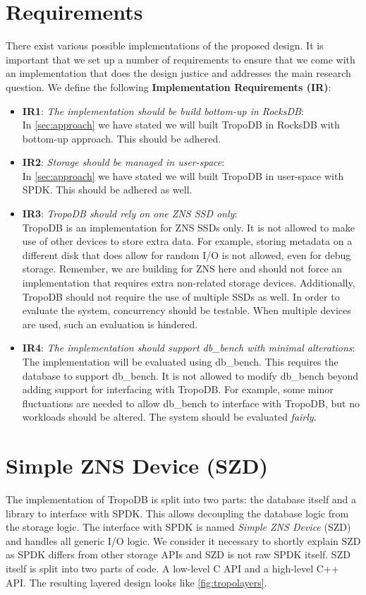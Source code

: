 \section{Requirements}
There exist various possible implementations of the proposed design. It is important that we set up a number of requirements to ensure that we come with an implementation that does the design justice and addresses the main research question. We define the following \textbf{Implementation Requirements (IR)}:
\begin{itemize}
    \item \textbf{IR1}: \textit{The implementation should be build bottom-up in RocksDB}:\\
    In \autoref{sec:approach} we have stated we will built TropoDB in RocksDB with bottom-up approach. This should be adhered.
    \item \textbf{IR2}: \textit{Storage should be managed in user-space}:\\
    In \autoref{sec:approach} we have stated we will built TropoDB in user-space with SPDK. This should be adhered as well.
    \item \textbf{IR3}: \textit{TropoDB should rely on one ZNS SSD only}:\\
    TropoDB is an implementation for ZNS SSDs only. It is not allowed to make use of other devices to store extra data. For example, storing metadata on a different disk that does allow for random I/O is not allowed, even for debug storage. Remember, we are building for ZNS here and should not force an implementation that requires extra non-related storage devices. Additionally, TropoDB should not require the use of multiple SSDs as well. In order to evaluate the system, concurrency should be testable. When multiple devices are used, such an evaluation is hindered.
    \item \textbf{IR4}: \textit{The implementation should support db\_bench with minimal alterations}:\\
    The implementation will be evaluated using db\_bench. This requires the database to support db\_bench. It is not allowed to modify db\_bench beyond adding support for interfacing with TropoDB. For example, some minor fluctuations are needed to allow db\_bench to interface with TropoDB, but no workloads should be altered. The system should be evaluated \textit{fairly}.
\end{itemize}

\section{Simple ZNS Device (SZD)}
The implementation of TropoDB is split into two parts: the database itself and a library to interface with SPDK. This allows decoupling the database logic from the storage logic. The interface with SPDK is named \textit{Simple ZNS Device} (SZD) and handles all generic I/O logic. We consider it necessary to shortly explain SZD as SPDK differs from other storage APIs and SZD is not raw SPDK itself. SZD itself is split into two parts of code. A low-level C API and a high-level C++ API. The resulting layered design looks like \autoref{fig:tropolayers}.

